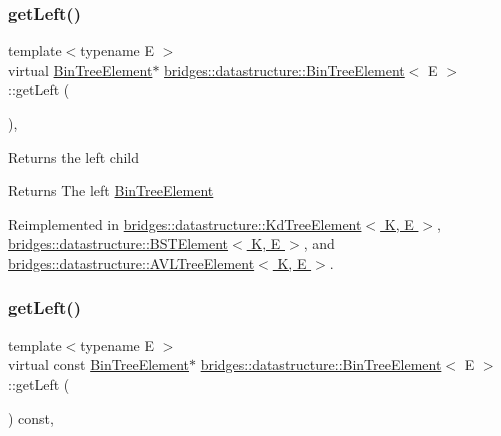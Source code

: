 \subsubsection{\texorpdfstring{get\+Left()}{getLeft()}\hspace{0.1cm}{\footnotesize\ttfamily [1/2]}}
{\footnotesize\ttfamily template$<$typename E $>$ \\
virtual \hyperlink{classbridges_1_1datastructure_1_1_bin_tree_element}{Bin\+Tree\+Element}$\ast$ \hyperlink{classbridges_1_1datastructure_1_1_bin_tree_element}{bridges\+::datastructure\+::\+Bin\+Tree\+Element}$<$ E $>$\+::get\+Left (\begin{DoxyParamCaption}{ }\end{DoxyParamCaption})\hspace{0.3cm}{\ttfamily [inline]}, {\ttfamily [virtual]}}

Returns the left child \begin{DoxyReturn}{Returns}
The left \hyperlink{classbridges_1_1datastructure_1_1_bin_tree_element}{Bin\+Tree\+Element} 
\end{DoxyReturn}


Reimplemented in \hyperlink{classbridges_1_1datastructure_1_1_kd_tree_element_a875bfa2dfd88a7740f7bcd28a117c12a}{bridges\+::datastructure\+::\+Kd\+Tree\+Element$<$ K, E $>$}, \hyperlink{classbridges_1_1datastructure_1_1_b_s_t_element_af863c624691c11db26ae3b6d723d1f5c}{bridges\+::datastructure\+::\+B\+S\+T\+Element$<$ K, E $>$}, and \hyperlink{classbridges_1_1datastructure_1_1_a_v_l_tree_element_ab05925e343b9fa71b61c71e8034e1293}{bridges\+::datastructure\+::\+A\+V\+L\+Tree\+Element$<$ K, E $>$}.

\mbox{\label{classbridges_1_1datastructure_1_1_bin_tree_element_ae14a70e2d25ad62337c87059b0cadb48}} 
\subsubsection{\texorpdfstring{get\+Left()}{getLeft()}\hspace{0.1cm}{\footnotesize\ttfamily [2/2]}}
{\footnotesize\ttfamily template$<$typename E $>$ \\
virtual const \hyperlink{classbridges_1_1datastructure_1_1_bin_tree_element}{Bin\+Tree\+Element}$\ast$ \hyperlink{classbridges_1_1datastructure_1_1_bin_tree_element}{bridges\+::datastructure\+::\+Bin\+Tree\+Element}$<$ E $>$\+::get\+Left (\begin{DoxyParamCaption}{ }\end{DoxyParamCaption}) const\hspace{0.3cm}{\ttfamily [inline]}, {\ttfamily [virtual]}}

